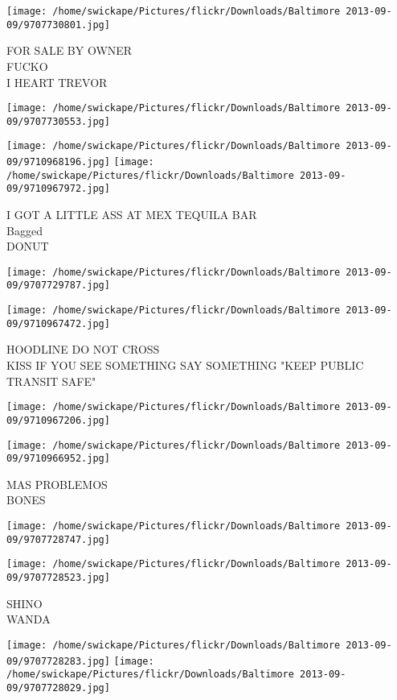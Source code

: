 \documentclass[10pt,letterpaper]{article}
\begin{document}
\texttt{[image: /home/swickape/Pictures/flickr/Downloads/Baltimore 2013-09-09/9707730801.jpg]}

FOR SALE BY OWNER\\
FUCKO\\
I HEART TREVOR
\pagebreak

\texttt{[image: /home/swickape/Pictures/flickr/Downloads/Baltimore 2013-09-09/9707730553.jpg]}

\vspace{0.25in}
\texttt{[image: /home/swickape/Pictures/flickr/Downloads/Baltimore 2013-09-09/9710968196.jpg]}
\texttt{[image: /home/swickape/Pictures/flickr/Downloads/Baltimore 2013-09-09/9710967972.jpg]}

I GOT A LITTLE ASS AT MEX TEQUILA BAR\\
Bagged\\
DONUT
\pagebreak

\texttt{[image: /home/swickape/Pictures/flickr/Downloads/Baltimore 2013-09-09/9707729787.jpg]}

\vspace{0.25in}
\texttt{[image: /home/swickape/Pictures/flickr/Downloads/Baltimore 2013-09-09/9710967472.jpg]}

HOODLINE DO NOT CROSS\\
KISS IF YOU SEE SOMETHING SAY SOMETHING "KEEP PUBLIC TRANSIT SAFE"
\pagebreak

\texttt{[image: /home/swickape/Pictures/flickr/Downloads/Baltimore 2013-09-09/9710967206.jpg]}

\vspace{0.25in}
\texttt{[image: /home/swickape/Pictures/flickr/Downloads/Baltimore 2013-09-09/9710966952.jpg]}

MAS PROBLEMOS\\
BONES
\pagebreak

\texttt{[image: /home/swickape/Pictures/flickr/Downloads/Baltimore 2013-09-09/9707728747.jpg]}

\vspace{0.25in}
\texttt{[image: /home/swickape/Pictures/flickr/Downloads/Baltimore 2013-09-09/9707728523.jpg]}

SHINO\\
WANDA
\pagebreak

\texttt{[image: /home/swickape/Pictures/flickr/Downloads/Baltimore 2013-09-09/9707728283.jpg]}
\texttt{[image: /home/swickape/Pictures/flickr/Downloads/Baltimore 2013-09-09/9707728029.jpg]}
\end{document}
